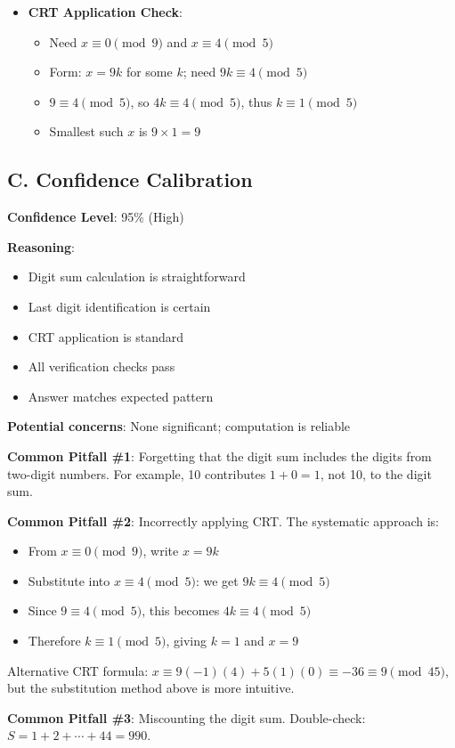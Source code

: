 \documentclass[11pt]{article}
\begin{document}
\begin{verificationbox}
\begin{itemize}[leftmargin=*]
    \item \textbf{CRT Application Check}:
    \begin{itemize}
        \item Need $x \equiv 0 \pmod{9}$ and $x \equiv 4 \pmod{5}$
        \item Form: $x = 9k$ for some $k$; need $9k \equiv 4 \pmod{5}$
        \item $9 \equiv 4 \pmod{5}$, so $4k \equiv 4 \pmod{5}$, thus $k \equiv 1 \pmod{5}$
        \item Smallest such $x$ is $9 \times 1 = 9$ \checkmark
    \end{itemize}
\end{itemize}

\subsection*{C. Confidence Calibration}
\textbf{Confidence Level}: 95\% (High)

\textbf{Reasoning}:
\begin{itemize}
    \item Digit sum calculation is straightforward
    \item Last digit identification is certain
    \item CRT application is standard
    \item All verification checks pass
    \item Answer matches expected pattern
\end{itemize}

\textbf{Potential concerns}: None significant; computation is reliable
\end{verificationbox}

\begin{warningbox}
\textbf{Common Pitfall \#1}: Forgetting that the digit sum includes the digits from two-digit numbers. For example, 10 contributes $1+0=1$, not 10, to the digit sum.

\textbf{Common Pitfall \#2}: Incorrectly applying CRT. The systematic approach is:
\begin{itemize}
    \item From $x \equiv 0 \pmod{9}$, write $x = 9k$
    \item Substitute into $x \equiv 4 \pmod{5}$: we get $9k \equiv 4 \pmod{5}$
    \item Since $9 \equiv 4 \pmod{5}$, this becomes $4k \equiv 4 \pmod{5}$
    \item Therefore $k \equiv 1 \pmod{5}$, giving $k = 1$ and $x = 9$
\end{itemize}

Alternative CRT formula: $x \equiv 9(-1)(4) + 5(1)(0) \equiv -36 \equiv 9 \pmod{45}$, but the substitution method above is more intuitive.

\textbf{Common Pitfall \#3}: Miscounting the digit sum. Double-check: $S = 1+2+\cdots+44 = 990$.
\end{warningbox}
\end{document}
